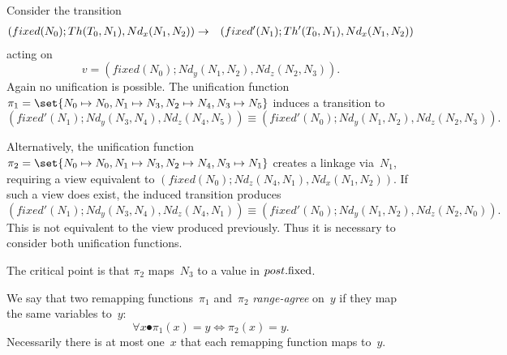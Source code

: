 
\begin{example}\label{example:singleRef-remapping-post-servers}
Consider the transition
% 
\begin{eqnarray*}
(fixed(N_0); Th(T_0,N_1), Nd_x(N_1,N_2)) & \stackrel{}\rightarrow &
  (fixed'(N_1); Th'(T_0,N_1), Nd_x(N_1,N_2))
\end{eqnarray*}
acting on
\[
v = (fixed(N_0); Nd_y(N_1,N_2), Nd_z(N_2,N_3)).
\]
Again no unification is possible.  The unification function $\pi_1 = \set{N_0
  \mapsto N_0, \linebreak[1] {N_1 \mapsto N_3}, \linebreak[1] N_2 \mapsto N_4,
  \linebreak[1] {N_3 \mapsto N_5}}$ induces a transition to
\[
(fixed'(N_1); Nd_y(N_3,N_4), Nd_z(N_4,N_5)) \equiv
(fixed'(N_0); Nd_y(N_1,N_2), Nd_z(N_2,N_3)).
\]

Alternatively, the unification function $\pi_2 = \set{N_0 \mapsto N_0, N_1
  \mapsto N_3, N_2 \mapsto N_4, \linebreak[1] {N_3 \mapsto N_1}}$  creates
a linkage via~$N_1$, requiring a view equivalent to $(fixed(N_0);
Nd_z(N_4,N_1), Nd_x(N_1,N_2))$.  If such a view does exist, the induced
transition produces
\[
(fixed'(N_1); Nd_y(N_3,N_4), Nd_z(N_4,N_1)) \equiv
(fixed'(N_0); Nd_y(N_1,N_2), Nd_z(N_2,N_0)).
\]
This is not equivalent to the view produced previously.  Thus it is necessary
to consider both unification functions.

The critical point is that $\pi_2$ maps~$N_3$ to a value in $post.\mathrm{fixed}$.
\end{example}




We say that two remapping functions~$\pi_1$ and~$\pi_2$ \emph{range-agree}
on~$y$ if they map the same variables to~$y$:
\[
\forall x \spot \pi_1(x) = y \iff \pi_2(x) = y.
\]
Necessarily there is at most one~$x$ that each remapping function maps
to~$y$.

